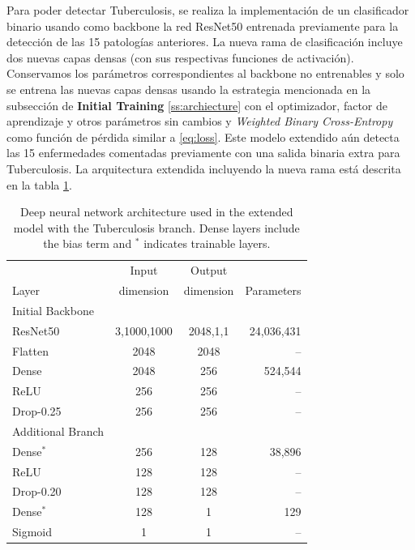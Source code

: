 {Para poder detectar Tuberculosis, se realiza la implementación de un clasificador binario usando como
backbone la red ResNet50 entrenada previamente para la detección de las 15 patologías anteriores.
La nueva rama de clasificación incluye dos nuevas capas densas (con sus respectivas funciones de
activación). Conservamos los parámetros correspondientes al backbone no entrenables y solo se entrena
las nuevas capas densas usando la estrategia mencionada en la subsección de {\bf Initial Training}
\ref{ss:archiecture} con el optimizador, factor de aprendizaje y otros parámetros sin cambios y
\textit{Weighted Binary Cross-Entropy} como función de pérdida similar a \eqref{eq:loss}. Este modelo
extendido aún detecta las 15 enfermedades comentadas previamente con una salida binaria extra para
Tuberculosis. La arquitectura extendida incluyendo la nueva rama está descrita en la tabla
\ref{table_resnet50_tb}.

\begin{table}[!ht]
    \centering
    \begin{tabular}{| l| c | c | r |}
     \hline
                 &  Input       & Output           &   \\
    Layer        &  dimension    & dimension        & Parameters \\
    \hline\hline
    Initial Backbone & & & \\ \hline
    ResNet50     &  3,1000,1000 &     2048,1,1     & 24,036,431 \\
    Flatten      &     2048     &     2048         &  --        \\
    Dense        &     2048     &     256          & 524,544    \\
    ReLU         &     256      &     256          & --         \\
    Drop-0.25    &     256      &     256          & --         \\
    \hline
    Additional Branch & & & \\ \hline
    Dense$^\ast$ &     256      &     128          &  38,896     \\
    ReLU         &     128      &     128          & --         \\
    Drop-0.20    &     128      &     128          & --         \\
    Dense$^\ast$ &     128      &      1           &  129       \\
    Sigmoid      &      1       &      1           & --         \\
     \hline
    \end{tabular}
    \caption{Deep neural network architecture used in the extended model with the Tuberculosis branch. Dense layers include the bias term and $^\ast$ indicates trainable layers.}
\label{table_resnet50_tb}
\end{table}

}
